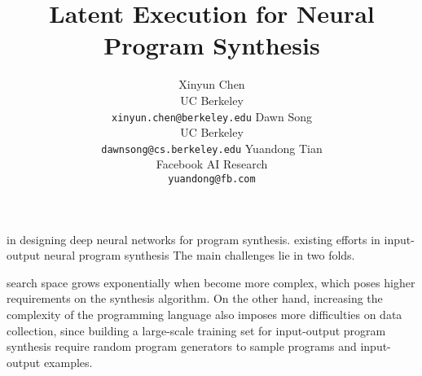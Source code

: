 \documentclass{article}
\title{Latent Execution for Neural Program Synthesis}
\author{
    Xinyun Chen \\
    UC Berkeley \\ 
    \texttt{xinyun.chen@berkeley.edu} 
    \And 
    Dawn Song \\
    UC Berkeley \\ 
    \texttt{dawnsong@cs.berkeley.edu}
    \And
    Yuandong Tian \\
    Facebook AI Research \\
    \texttt{yuandong@fb.com}
}
\begin{document}


\maketitle

\iffalse
\begin{abstract}
Program synthesis from input-output examples has been a long-standing challenge, and recent works have demonstrated some success in designing deep neural networks for program synthesis. However, existing efforts in input-output neural program synthesis have been focusing on domain-specific languages, thus the applicability of previous approaches to synthesize code in full-fledged popular programming languages, such as C, remains a question. The main challenges lie in two folds. On the one hand, the program search space grows exponentially when the syntax and semantics of the programming language become more complex, which poses higher requirements on the synthesis algorithm. On the other hand, increasing the complexity of the programming language also imposes more difficulties on data collection, since building a large-scale training set for input-output program synthesis require random program generators to sample programs and input-output examples. In this work, we take the first step to synthesize C programs from input-output examples. In particular, we propose {\ours}, which learns the latent representation to approximate the execution of partially generated programs, even if their semantics are not well-defined. We demonstrate the possibility of synthesizing elementary C code from input-output examples, and leveraging learned execution significantly improves the prediction performance over existing approaches. Meanwhile, compared to the randomly generated ground-truth programs, {\ours} synthesizes more concise programs that resemble human-written code. We show that training on these synthesized programs further improves the prediction performance for both Karel and C program synthesis, indicating the promise of leveraging the learned program synthesizer to improve the dataset quality for input-output program synthesis.
\end{abstract}
\fi

\iffalse 
in designing deep neural networks for program synthesis.
existing efforts in input-output neural program synthesis 
The main challenges lie in two folds. 

search space grows exponentially when become more complex, which poses higher requirements on the synthesis algorithm. On the other hand, increasing the complexity of the programming language also imposes more difficulties on data collection, since building a large-scale training set for input-output program synthesis require random program generators to sample programs and input-output examples. 
\end{document}
